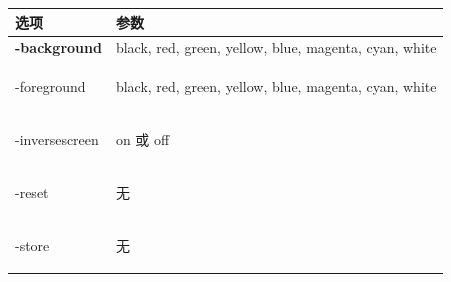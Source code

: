 \documentclass[border=15pt]{standalone}
\begin{document}
\sffamily
\renewcommand{\arraystretch}{1.5}

\begin{tabularx}{13cm}{>{\bfseries}p{3.5cm} X}
	\rowcolor{headerbg}
	\toprule
	\textcolor{headertext}{\textbf{选项}} & \textcolor{headertext}{\textbf{参数}}                     \\
	\midrule

	-background                         & black, red, green, yellow, blue, magenta, cyan, white                       \\
	\addlinespace[0.5ex]

	-foreground                         & black, red, green, yellow, blue, magenta, cyan, white                      \\
	\addlinespace[0.5ex]

	-inversescreen                      & on 或 off                                                        \\
	\addlinespace[0.5ex]

	-reset                              & 无                                                                 \\
	\addlinespace[0.5ex]

	-store                              & 无                                                     \\

	\bottomrule
\end{tabularx}
\end{document}
